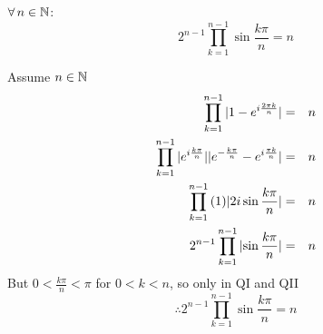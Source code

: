 \documentclass[letterpaper,12pt,fleqn]{article}
\begin{document}
\begin{corollary}
  $\forall\,n\in\mathbb{N}$:
  \[2^{n-1}\prod_{k=1}^{n-1}{\sin{\frac{k\pi}{n}}}=n\]
\end{corollary}

\begin{theproof}
  Assume $n\in\mathbb{N}$
  \begin{eqnarray*}
    \prod_{k=1}^{n-1}{\lvert1-e^{i\frac{2\pi k}{n}}\rvert} &=& n \\
    \prod_{k=1}^{n-1}{
    \lvert e^{i\frac{k\pi}{n}}\rvert\lvert e^{-\frac{k\pi}{n}}-e^{i\frac{\pi k}{n}}\rvert} &=& n \\
    \prod_{k=1}^{n-1}{(1)\lvert2i\sin{\frac{k\pi}{n}}\rvert} &=& n \\
    2^{n-1}\prod_{k=1}^{n-1}{\lvert\sin{\frac{k\pi}{n}}\rvert} &=& n \\
  \end{eqnarray*}
  But $0<\frac{k\pi}{n}<\pi$ for $0<k<n$, so only in QI and QII
  \[\therefore2^{n-1}\prod_{k=1}^{n-1}{\sin{\frac{k\pi}{n}}}=n\]
\end{theproof}
\end{document}
